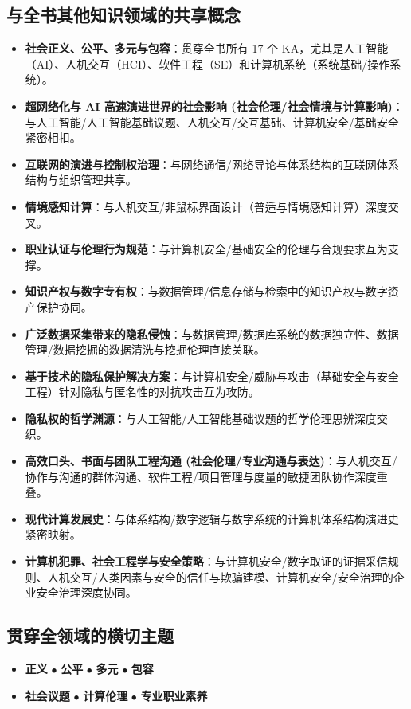 \subsection{与全书其他知识领域的共享概念}
\begin{itemize}
    \item \textbf{社会正义、公平、多元与包容}：贯穿全书所有 17 个 KA，尤其是人工智能（AI）、人机交互（HCI）、软件工程（SE）和计算机系统（系统基础/操作系统）。
    \item \textbf{超网络化与 AI 高速演进世界的社会影响 (社会伦理/社会情境与计算影响)}：与人工智能/人工智能基础议题、人机交互/交互基础、计算机安全/基础安全紧密相扣。
    \item \textbf{互联网的演进与控制权治理}：与网络通信/网络导论与体系结构的互联网体系结构与组织管理共享。
    \item \textbf{情境感知计算}：与人机交互/非鼠标界面设计（普适与情境感知计算）深度交叉。
    \item \textbf{职业认证与伦理行为规范}：与计算机安全/基础安全的伦理与合规要求互为支撑。
    \item \textbf{知识产权与数字专有权}：与数据管理/信息存储与检索中的知识产权与数字资产保护协同。
    \item \textbf{广泛数据采集带来的隐私侵蚀}：与数据管理/数据库系统的数据独立性、数据管理/数据挖掘的数据清洗与挖掘伦理直接关联。
    \item \textbf{基于技术的隐私保护解决方案}：与计算机安全/威胁与攻击（基础安全与安全工程）针对隐私与匿名性的对抗攻击互为攻防。
    \item \textbf{隐私权的哲学渊源}：与人工智能/人工智能基础议题的哲学伦理思辨深度交织。
    \item \textbf{高效口头、书面与团队工程沟通 (社会伦理/专业沟通与表达)}：与人机交互/协作与沟通的群体沟通、软件工程/项目管理与度量的敏捷团队协作深度重叠。
    \item \textbf{现代计算发展史}：与体系结构/数字逻辑与数字系统的计算机体系结构演进史紧密映射。
    \item \textbf{计算机犯罪、社会工程学与安全策略}：与计算机安全/数字取证的证据采信规则、人机交互/人类因素与安全的信任与欺骗建模、计算机安全/安全治理的企业安全治理深度协同。
\end{itemize}

\subsection{贯穿全领域的横切主题}
\begin{itemize}
    \item \textbf{正义} \quad $\bullet$ \textbf{公平} \quad $\bullet$ \textbf{多元} \quad $\bullet$ \textbf{包容}
    \item \textbf{社会议题} \quad $\bullet$ \textbf{计算伦理} \quad $\bullet$ \textbf{专业职业素养}
\end{itemize}

